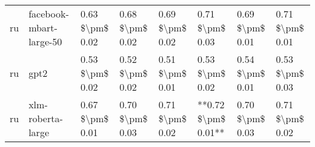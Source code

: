 \begin{tabular}{llllllll}
      ru &            facebook-mbart-large-50 & 0.63 \$\textbackslash pm\$ 0.02 &           0.68 \$\textbackslash pm\$ 0.02 &       0.69 \$\textbackslash pm\$ 0.02 &        0.71 \$\textbackslash pm\$ 0.03 &                         0.69 \$\textbackslash pm\$ 0.01 &     0.71 \$\textbackslash pm\$ 0.01 \\
      ru &                               gpt2 & 0.53 \$\textbackslash pm\$ 0.02 &           0.52 \$\textbackslash pm\$ 0.02 &       0.51 \$\textbackslash pm\$ 0.01 &        0.53 \$\textbackslash pm\$ 0.02 &                         0.54 \$\textbackslash pm\$ 0.01 &     0.53 \$\textbackslash pm\$ 0.03 \\
      ru &                  xlm-roberta-large & 0.67 \$\textbackslash pm\$ 0.01 &           0.70 \$\textbackslash pm\$ 0.03 &       0.71 \$\textbackslash pm\$ 0.02 &    **0.72 \$\textbackslash pm\$ 0.01** &                         0.70 \$\textbackslash pm\$ 0.03 &     0.71 \$\textbackslash pm\$ 0.02 \\
\bottomrule
\end{tabular}
